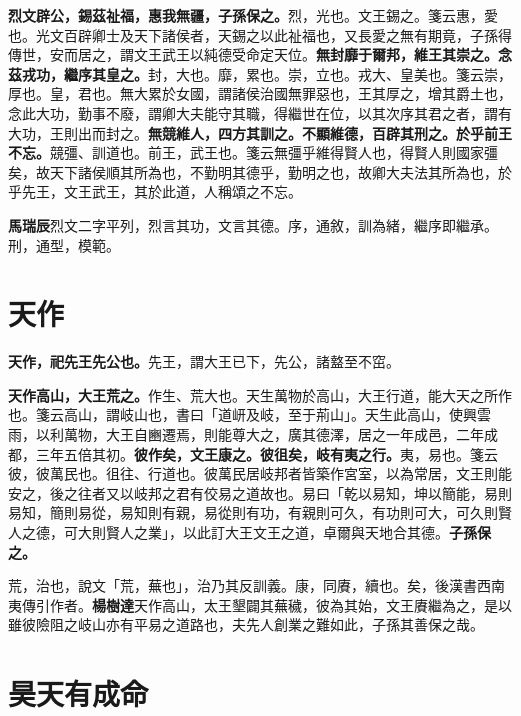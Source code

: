 \textbf{烈文辟公，錫茲祉福，惠我無疆，子孫保之。}{\footnotesize 烈，光也。文王錫之。箋云惠，愛也。光文百辟卿士及天下諸侯者，天錫之以此祉福也，又長愛之無有期竟，子孫得傳世，安而居之，謂文王武王以純德受命定天位。}\textbf{無封靡于爾邦，維王其崇之。念茲戎功，繼序其皇之。}{\footnotesize 封，大也。靡，累也。崇，立也。戎大、皇美也。箋云崇，厚也。皇，君也。無大累於女國，謂諸侯治國無罪惡也，王其厚之，增其爵土也，念此大功，勤事不廢，謂卿大夫能守其職，得繼世在位，以其次序其君之者，謂有大功，王則出而封之。}\textbf{無競維人，四方其訓之。不顯維德，百辟其刑之。於乎前王不忘。}{\footnotesize 競彊、訓道也。前王，武王也。箋云無彊乎維得賢人也，得賢人則國家彊矣，故天下諸侯順其所為也，不勤明其德乎，勤明之也，故卿大夫法其所為也，於乎先王，文王武王，其於此道，人稱頌之不忘。}

\begin{quoting}\textbf{馬瑞辰}烈文二字平列，烈言其功，文言其德。序，通敘，訓為緒，繼序即繼承。刑，通型，模範。\end{quoting}

\section{天作}


\textbf{天作，祀先王先公也。}{\footnotesize 先王，謂大王已下，先公，諸盩至不窋。}

\textbf{天作高山，大王荒之。}{\footnotesize 作生、荒大也。天生萬物於高山，大王行道，能大天之所作也。箋云高山，謂岐山也，書曰「道岍及岐，至于荊山」。天生此高山，使興雲雨，以利萬物，大王自豳遷焉，則能尊大之，廣其德澤，居之一年成邑，二年成都，三年五倍其初。}\textbf{彼作矣，文王康之。彼徂矣，岐有夷之行。}{\footnotesize 夷，易也。箋云彼，彼萬民也。徂往、行道也。彼萬民居岐邦者皆築作宮室，以為常居，文王則能安之，後之往者又以岐邦之君有佼易之道故也。易曰「乾以易知，坤以簡能，易則易知，簡則易從，易知則有親，易從則有功，有親則可久，有功則可大，可久則賢人之德，可大則賢人之業」，以此訂大王文王之道，卓爾與天地合其德。}\textbf{子孫保之。}

\begin{quoting}荒，治也，說文「荒，蕪也」，治乃其反訓義。康，同賡，續也。矣，後漢書西南夷傳引作者。\textbf{楊樹達}天作高山，太王墾闢其蕪穢，彼為其始，文王賡繼為之，是以雖彼險阻之岐山亦有平易之道路也，夫先人創業之難如此，子孫其善保之哉。\end{quoting}

\section{昊天有成命}


